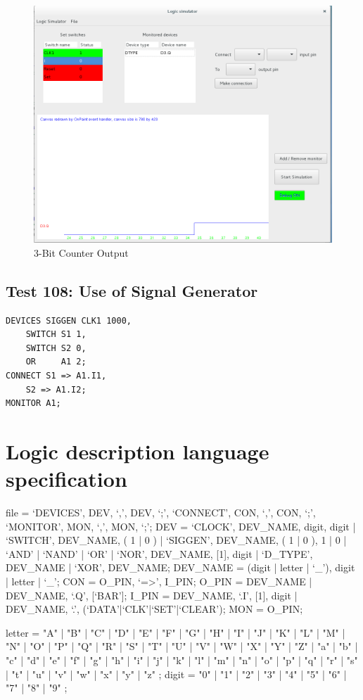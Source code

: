 \documentclass[12pt]{article}
\newenvironment{metaverbatim}{\verbatim}{\endverbatim}
\begin{document}
\begin{figure}[H]
	\centering
	\includegraphics[width=0.9\linewidth]{figures/test107_GUI.png}
	\captionsetup{width=.7\linewidth}
	\caption{3-Bit Counter Output}
	\label{fig:7}
\end{figure}

\subsection{Test 108: Use of Signal Generator}
\begin{verbatim}
DEVICES	SIGGEN CLK1 1000,
	SWITCH S1 1,
	SWITCH S2 0,
	OR     A1 2;
CONNECT	S1 => A1.I1,
	S2 => A1.I2;
MONITOR	A1;
\end{verbatim}



\newpage
\section{Logic description language specification}
\begin{metaverbatim}
file =  `DEVICES', DEV, {`,', DEV}, `;', `CONNECT', CON, {`,', CON}, `;',
        `MONITOR', MON, {`,', MON}, `;';
DEV  =  `CLOCK', DEV_NAME, digit, {digit} |
        `SWITCH', DEV_NAME, ( 1 | 0 ) |
        `SIGGEN', DEV_NAME, ( 1 | 0 ), { 1 | 0 } |
        `AND' | `NAND' | `OR' | `NOR', DEV_NAME, [1], digit	|
        `D_TYPE', DEV_NAME |
        `XOR', DEV_NAME;
DEV_NAME  =	 (digit | letter | `_'), {digit | letter | `_'};
CON       =  O_PIN, `=>', I_PIN;
O_PIN     =  DEV_NAME |
             DEV_NAME, `.Q', [`BAR'];
I_PIN     =  DEV_NAME, `.I', [1], digit	|
             DEV_NAME, `.', (`DATA'|`CLK'|`SET'|`CLEAR');
MON       =  O_PIN;

letter = "A" | "B" | "C" | "D" | "E" | "F" | "G"
       | "H" | "I" | "J" | "K" | "L" | "M" | "N"
       | "O" | "P" | "Q" | "R" | "S" | "T" | "U"
       | "V" | "W" | "X" | "Y" | "Z" | "a" | "b"
       | "c" | "d" | "e" | "f" | "g" | "h" | "i"
       | "j" | "k" | "l" | "m" | "n" | "o" | "p"
       | "q" | "r" | "s" | "t" | "u" | "v" | "w"
       | "x" | "y" | "z" ;
digit = "0" | "1" | "2" | "3" | "4" | "5" | "6" | "7" | "8" | "9" ;

\end{metaverbatim}
\end{document}
